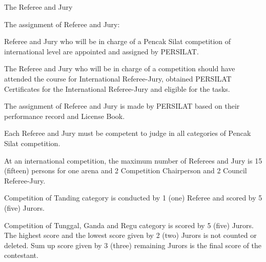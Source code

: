 \begin{legal}
\item The Referee and Jury
    \begin{legal}
    \item The assignment of Referee and Jury:
        \begin{legal}
        \item Referee and Jury who will be in charge of a Pencak Silat competition of international level are appointed and assigned by PERSILAT.
        \item The Referee and Jury who will be in charge of a competition should have
attended the course for International Referee-Jury, obtained PERSILAT
Certificates for the International Referee-Jury and eligible for the tasks.
        \item The assignment of Referee and Jury is made by PERSILAT based on their
performance record and License Book.
        \item Each Referee and Jury must be competent to judge in all categories of Pencak Silat 
            competition.
        \end{legal}
    \item At an international competition, the maximum number of Referees and Jury is 15
        (fifteen) persons for one arena and 2 Competition Chairperson and 2 Council
        Referee-Jury.
        \begin{legal}
        \item Competition of Tanding category is conducted by 1 (one) Referee and scored by 5 (five) Jurors.
        \item Competition of Tunggal, Ganda and Regu category is scored by 5 (five) Jurors. The highest score and the lowest score given by 2 (two) Jurors is not counted or deleted. Sum up score given by 3 (three) remaining Jurors is the final score of the contestant.
        \end{legal}


\end{legal}
\end{legal}
